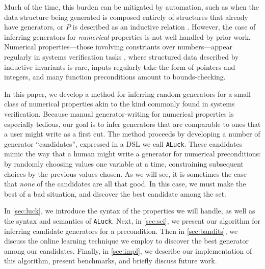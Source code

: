 \documentclass[sigconf,nonacm,review,anonymous]{acmart}
\begin{document}
Much of the time, this burden can be mitigated by automation, such as when the data structure being generated
is composed entirely of structures that already have generators, or $P$ is described as an inductive
relation \cite{gggir}. However, the case of inferring generators for \emph{numerical} properties is not well
handled by prior work. Numerical properties---those involving constriants over numbers---appear regularly in
systems verification tasks \cite{???}, where structured data described by inductive invariants is rare, inputs regularly
take the form of pointers and integers, and many function preconditions amount to bounds-checking.

In this paper, we develop a method for inferring random generators for a small class of numerical properties akin
to the kind commonly found in systems verification. Because manual generator-writing for numerical properties is especially
tedious, our goal is to infer generators that are comparable to ones that a user might write as a first cut.
The method proceeds by developing a number of generator ``candidates'', expressed in a DSL we call \texttt{ALuck}.
These candidates mimic the way that a human might write a generator for numerical preconditions: by randomly choosing values
one variable at a time, constraining subsequent choices by the previous values chosen. As we will see, it is sometimes the
case that \emph{none} of the candidates are all that good. In this case, we must make the best of a bad situation, and
discover the best candidate among the set.

In \autoref{sec:luck}, we introduce the syntax of the properties we will handle,
as well as the syntax and semantics of \texttt{ALuck}. Next, in \autoref{sec:sci},
we present our algorithm for inferring candidate
generators for a precondition. Then in \autoref{sec:bandits}, we discuss the online
learning technique we employ to discover the best generator among our
candidates. Finally, in \autoref{sec:impl}, we describe our implementation of
this algorithm, present benchmarks, and briefly discuss future work.


\end{document}
